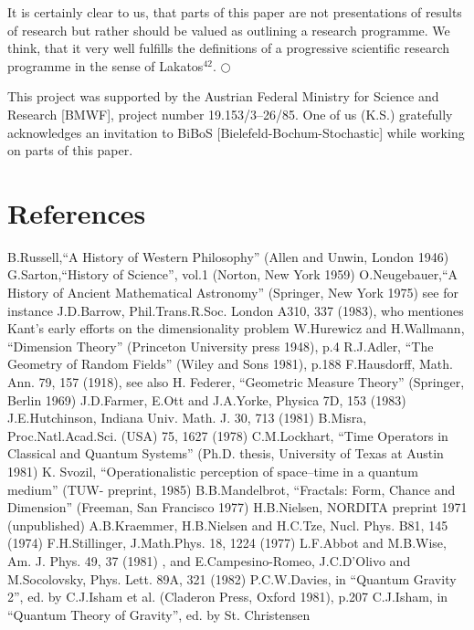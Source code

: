 It is certainly clear to us,
that parts of this paper are not presentations of results
of research but rather should be valued as
outlining a research programme.
We think, that it very well fulfills the
definitions of a progressive scientific
research programme in the sense of Lakatos$^{42}$.
$\bigcirc $


This project was supported by the Austrian Federal Ministry
for Science and Research [BMWF], project number 19.153/3--26/85.
One of us (K.S.) gratefully acknowledges an invitation
to BiBoS [Bielefeld-Bochum-Stochastic] while working on parts of
this paper.


\endchapter
\chapter{References}
\itemize{1cm}
\litem{[1]}B.Russell,``A History of Western Philosophy''
(Allen and Unwin, London 1946)
\litem{[2]}G.Sarton,``History of Science'', vol.1
(Norton, New York 1959)
\litem{[3]}O.Neugebauer,``A History of Ancient Mathematical
Astronomy'' (Springer, New York 1975)
\litem{[4]}see for instance J.D.Barrow,
Phil.Trans.R.Soc. London A310, 337 (1983),
who mentiones Kant's early efforts on the dimensionality
problem
\litem{[5]}W.Hurewicz and H.Wallmann,
``Dimension Theory'' (Princeton University press 1948), p.4
\litem{[6]}R.J.Adler, ``The Geometry of Random Fields''
(Wiley and Sons 1981), p.188
\litem{[7]}F.Hausdorff, Math. Ann. 79, 157 (1918),
see also H. Federer, ``Geometric Measure Theory''
(Springer, Berlin 1969)
\litem{[8]}J.D.Farmer, E.Ott and J.A.Yorke,
Physica 7D, 153 (1983)
\litem{[9]}J.E.Hutchinson, Indiana Univ. Math. J. 30, 713 (1981)
\litem{[10]}B.Misra, Proc.Natl.Acad.Sci. (USA) 75, 1627 (1978)
\litem{[11]}C.M.Lockhart,
``Time Operators in Classical and Quantum Systems''
(Ph.D. thesis, University of Texas at Austin 1981)
\litem{[12]}K. Svozil,
``Operationalistic perception of space--time
in a quantum medium'' (TUW- preprint, 1985)
\litem{[13]}B.B.Mandelbrot,
``Fractals: Form, Chance and Dimension''
(Freeman, San Francisco 1977)
\litem{[14]}H.B.Nielsen, NORDITA preprint 1971
(unpublished)
\litem{[15]}A.B.Kraemmer, H.B.Nielsen and H.C.Tze,
Nucl. Phys. B81, 145 (1974)
\litem{[16]}F.H.Stillinger, J.Math.Phys. 18, 1224 (1977)
\litem{[17]}L.F.Abbot and M.B.Wise, Am. J. Phys. 49, 37 (1981)
, and E.Campesino-Romeo, J.C.D'Olivo and
M.Socolovsky, Phys. Lett. 89A, 321 (1982)
\litem{[18]}P.C.W.Davies, in
``Quantum Gravity 2'', ed. by C.J.Isham et al.
(Claderon Press, Oxford 1981), p.207
\litem{[19]}C.J.Isham, in
``Quantum Theory of Gravity'', ed. by St. Christensen
